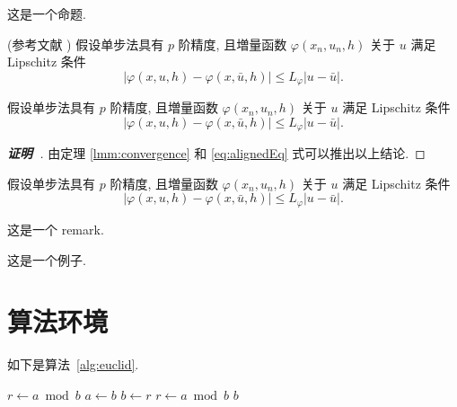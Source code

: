 \begin{proposition}[Proposition]
这是一个命题.
\end{proposition}

\begin{lemma}\label{lmm:convergence} (参考文献 \cite{LiLiu1997})
假设单步法具有 $p$ 阶精度, 且増量函数 $\varphi(x_{n}, u_{n}, h)$ 关于 $u$ 满足 Lipschitz 条件
\begin{equation}\label{eq:conver1}
|\varphi(x, u, h)-\varphi(x, \bar{u}, h)| \leqslant L_{\varphi}|u-\bar{u}|.
\end{equation}
\end{lemma}

\begin{theorem}\label{thm:convergence}
假设单步法具有 $p$ 阶精度, 且増量函数 $\varphi(x_{n}, u_{n}, h)$ 关于 $u$ 满足 Lipschitz 条件
\begin{equation}\label{eq:conver2}
|\varphi(x, u, h)-\varphi(x, \bar{u}, h)| \leqslant L_{\varphi}|u-\bar{u}|.
\end{equation}
\end{theorem}
\begin{proof}[\normalfont\bfseries 证明~\nopunct]
由定理 \ref{lmm:convergence} 和 \eqref{eq:alignedEq} 式可以推出以上结论.
\end{proof}

\begin{corollary}\label{col:convergence}
假设单步法具有 $p$ 阶精度, 且増量函数 $\varphi(x_{n}, u_{n}, h)$ 关于 $u$ 满足 Lipschitz 条件
\begin{equation}\label{eq:conver3}
|\varphi(x, u, h)-\varphi(x, \bar{u}, h)| \leqslant L_{\varphi}|u-\bar{u}|.
\end{equation}
\end{corollary}

\begin{remark}\label{rem:remark}
这是一个 remark.
\end{remark}

\begin{example}
这是一个例子.
\end{example}


\clearpage
\section{算法环境}

如下是算法~\ref{alg:euclid}.
\begin{algorithm}[H]
\small
\caption{~Euclid's algorithm}\label{alg:euclid}
\begin{algorithmic}[1]
  \State $r\gets a\bmod b$
  \State $a\gets b$
  \State $b\gets r$
  \State $r\gets a\bmod b$
  \EndWhile\label{euclidendwhile}
  \State \Return $b$
  \EndProcedure
\end{algorithmic}
\end{algorithm}



